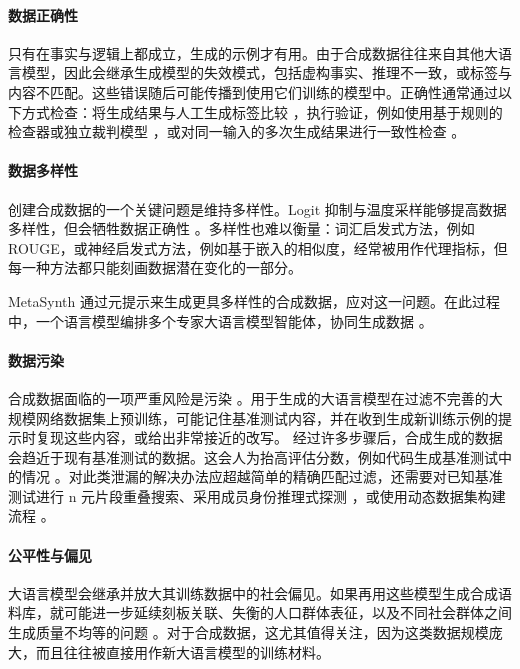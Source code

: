 \paragraph{数据正确性}
只有在事实与逻辑上都成立，生成的示例才有用。由于合成数据往往来自其他大语言模型，因此会继承生成模型的失效模式，包括虚构事实、推理不一致，或标签与内容不匹配。这些错误随后可能传播到使用它们训练的模型中。正确性通常通过以下方式检查：将生成结果与人工生成标签比较 \citep{long-etal-2024-llms, chim-etal-2025-evaluating}，执行验证，例如使用基于规则的检查器或独立裁判模型 \citep{chen-etal-2025-mastering, yang-etal-2025-longfaith, NEURIPS2024_4b77d5b8}，或对同一输入的多次生成结果进行一致性检查 \citep{NEURIPS2022_639a9a17, seegmiller-etal-2025-flames}。


\paragraph{数据多样性}
创建合成数据的一个关键问题是维持多样性。Logit 抑制与温度采样能够提高数据多样性，但会牺牲数据正确性 \citep{chung-etal-2023-increasing}。多样性也难以衡量：词汇启发式方法，例如 ROUGE，或神经启发式方法，例如基于嵌入的相似度，经常被用作代理指标，但每一种方法都只能刻画数据潜在变化的一部分。

MetaSynth 通过元提示来生成更具多样性的合成数据，应对这一问题。在此过程中，一个语言模型编排多个专家大语言模型智能体，协同生成数据 \citep{riaz-etal-2025-metasynth}。


\paragraph{数据污染}
合成数据面临的一项严重风险是污染 \citep{deng-etal-2024-unveiling, balloccu-etal-2024-leak}。用于生成的大语言模型在过滤不完善的大规模网络数据集上预训练，可能记住基准测试内容，并在收到生成新训练示例的提示时复现这些内容，或给出非常接近的改写。
经过许多步骤后，合成生成的数据会趋近于现有基准测试的数据。这会人为抬高评估分数，例如代码生成基准测试中的情况 \citep{matton-etal-2024-leakage}。对此类泄漏的解决办法应超越简单的精确匹配过滤，还需要对已知基准测试进行 n 元片段重叠搜索、采用成员身份推理式探测 \citep{puerto-etal-2025-scaling, huang-etal-2026-robust}，或使用动态数据集构建流程 \citep{chen-etal-2025-benchmarking-large}。

\paragraph{公平性与偏见}
大语言模型会继承并放大其训练数据中的社会偏见。如果再用这些模型生成合成语料库，就可能进一步延续刻板关联、失衡的人口群体表征，以及不同社会群体之间生成质量不均等的问题 \citep{gallegos2024bias}。对于合成数据，这尤其值得关注，因为这类数据规模庞大，而且往往被直接用作新大语言模型的训练材料。

